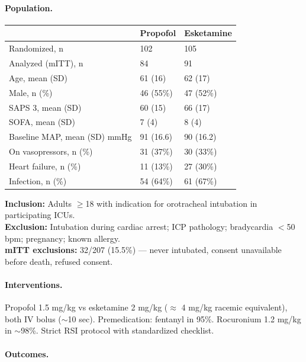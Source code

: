 \documentclass[11pt]{article}
\begin{document}
\paragraph{Population.}

\begin{table}[H]
\centering\footnotesize
\begin{tabularx}{\textwidth}{L{4cm} C{3cm} C{3cm}}
\toprule
& \textbf{Propofol} & \textbf{Esketamine} \\
\midrule
Randomized, n & 102 & 105 \\
Analyzed (mITT), n & 84 & 91 \\
Age, mean (SD) & 61 (16) & 62 (17) \\
Male, n (\%) & 46 (55\%) & 47 (52\%) \\
SAPS 3, mean (SD) & 60 (15) & 66 (17) \\
SOFA, mean (SD) & 7 (4) & 8 (4) \\
Baseline MAP, mean (SD) mmHg & 91 (16.6) & 90 (16.2) \\
On vasopressors, n (\%) & 31 (37\%) & 30 (33\%) \\
Heart failure, n (\%) & 11 (13\%) & 27 (30\%) \\
Infection, n (\%) & 54 (64\%) & 61 (67\%) \\
\bottomrule
\end{tabularx}
\end{table}

\noindent\textbf{Inclusion:} Adults $\geq$18 with indication for orotracheal intubation in participating ICUs.\\
\textbf{Exclusion:} Intubation during cardiac arrest; ICP pathology; bradycardia $<$50 bpm; pregnancy; known allergy.\\
\textbf{mITT exclusions:} 32/207 (15.5\%) --- never intubated, consent unavailable before death, refused consent.

\paragraph{Interventions.}
Propofol 1.5 mg/kg vs esketamine 2 mg/kg ($\approx$ 4 mg/kg racemic equivalent), both IV bolus ($\sim$10 sec). Premedication: fentanyl in 95\%. Rocuronium 1.2 mg/kg in $\sim$98\%. Strict RSI protocol with standardized checklist.

\paragraph{Outcomes.}
\end{document}
